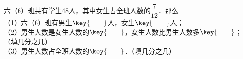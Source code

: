 六（6）班共有学生48人，其中女生占全班人数的$\dfrac {7}{12}$．那么\\
（1）六（6）班有男生$\key{\qquad}$人，女生$\key{\qquad}$人；\\
（2）男生人数是女生人数的$\key{\qquad}$，女生人数比男生人数多$\key{\qquad}$；（填几分之几）\\
（3）男生人数占全班人数的$\key{\qquad}$．（填几分之几）
